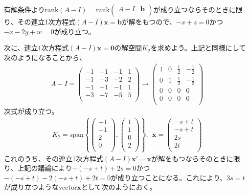 \documentclass[dvipdfmx]{jsarticle}
\begin{document}
有解条件より${\mathrm{rank}}(A - I) = {\mathrm{rank}}\begin{pmatrix}
A - I & \mathbf{b} \\
\end{pmatrix}$が成り立つならそのときに限り、その連立1次方程式$(A - I)\mathbf{x} = \mathbf{b}$が解をもつので、$- x + z = 0$かつ$- x - 2y + w = 0$が成り立つ。\par
次に、連立$1$次方程式$(A - I)\mathbf{x} = \mathbf{0}$の解空間$K_{2}$を求めよう。上記と同様にして次のようになることから、
\begin{align*}
A - I = \begin{pmatrix}
 - 1 & - 1 & - 1 & 1 \\
 - 1 & - 3 & - 2 & 2 \\
 - 1 & - 1 & - 1 & 1 \\
 - 3 & - 7 & - 5 & 5 \\
\end{pmatrix} \rightarrow \begin{pmatrix}
1 & 0 & \frac{1}{2} & - \frac{1}{2} \\
0 & 1 & \frac{1}{2} & - \frac{1}{2} \\
0 & 0 & 0 & 0 \\
0 & 0 & 0 & 0 \\
\end{pmatrix}
\end{align*}
次式が成り立つ。
\begin{align*}
K_{2} = {\mathrm{span}}\left\{ \begin{pmatrix}
 - 1 \\
 - 1 \\
2 \\
0 \\
\end{pmatrix},\begin{pmatrix}
1 \\
1 \\
0 \\
2 \\
\end{pmatrix} \right\},\ \ \mathbf{x} = \begin{pmatrix}
 - s + t \\
 - s + t \\
2s \\
2t \\
\end{pmatrix}
\end{align*}
これのうち、その連立1次方程式$(A - I)\mathbf{x}' = \mathbf{x}$が解をもつならそのときに限り、上記の議論により$- ( - s + t) + 2s = 0$かつ$- ( - s + t) - 2( - s + t) + 2t = 0$が成り立つことになる。これにより、$3s = t$が成り立つようなvector$\mathbf{x}$として次のようにおく。
\end{document}
